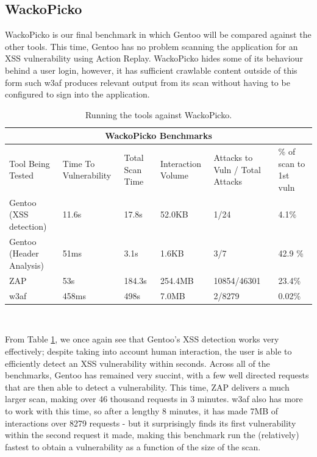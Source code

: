 \subsection{WackoPicko}

WackoPicko is our final benchmark in which Gentoo will be compared against the other tools. This time, Gentoo has no problem scanning the application for an XSS vulnerability using Action Replay. WackoPicko hides some of its behaviour behind a user login, however, it has sufficient crawlable content outside of this form such w3af produces relevant output from its scan without having to be configured to sign into the application. \\

\begin{table}[h]
	
	{
		\captionsetup{justification=centering}		
		\caption{Running the tools against WackoPicko.}
		\label{table:wackopicko_benchmarks}
		\begin{tabular}{ |p{4cm}||p{1.4cm}|p{1.4cm}|p{1.6cm}|p{2cm}|p{2cm}| }
			\hline
			\multicolumn{6}{|c|}{\textbf{WackoPicko Benchmarks}} \\ [0.5ex]
			\hline \hline 
			Tool Being Tested& Time To Vulnerability & Total Scan Time & Interaction Volume & Attacks to Vuln / Total Attacks & \% of scan to 1st vuln \\
			\hline
			Gentoo (XSS detection)    &   11.6s   &  17.8s   &  52.0KB           & 1/24 & 4.1\% \\
			Gentoo (Header Analysis) &  51ms &  3.1s  &  1.6KB  & 3/7 & 42.9 \%\\
			ZAP                                   & 53s &  184.3s   & 254.4MB & 10854/46301 & 23.4\%\\ 
			w3af                                 & 458ms & 498s & 7.0MB & 2/8279 & 0.02\% \\
			\hline
		\end{tabular}
	} \\
\end{table}

From Table \ref{table:wackopicko_benchmarks}, we once again see that Gentoo's XSS detection works very effectively; despite taking into account human interaction, the user is able to efficiently detect an XSS vulnerability within seconds. Across all of the benchmarks, Gentoo has remained very succint, with a few well directed requests that are then able to detect a vulnerability. This time, ZAP delivers a much larger scan, making over 46 thousand requests in 3 minutes. w3af also has more to work with this time, so after a lengthy 8 minutes, it has made 7MB of interactions over 8279 requests - but it surprisingly finds its first vulnerability within the second request it made, making this benchmark run the (relatively) fastest to obtain a vulnerability as a function of the size of the scan. \\


